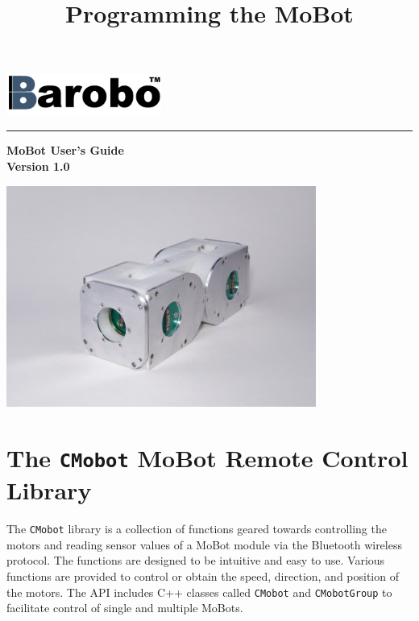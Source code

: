 \documentclass{article}
\title{Programming the MoBot}
\begin{document}
\includegraphics[width=2in]{images/Barobo.png}
\hrule
\begin{center}
\vspace*{2.5cm}
{\Huge\sf\bf MoBot User's Guide}\\
\vspace*{2.5cm}
{\Large\bf Version 1.0}
\vspace{4.5cm}

\includegraphics[width=4in]{images/imobot_module.jpg}
\end{center}

\newpage
\tableofcontents
\newpage
\section{The \texttt{CMobot} MoBot Remote Control Library}
The \texttt{CMobot} library is a collection of functions geared towards
controlling the motors and reading sensor values of a MoBot module via the
Bluetooth wireless protocol. The functions are designed to be intuitive
and easy to use. Various functions are provided to control or obtain the speed,
direction, and position of the motors. The API includes C++ classes called
\texttt{CMobot} and \texttt{CMobotGroup} to facilitate control of 
single and multiple MoBots.
\end{document}

